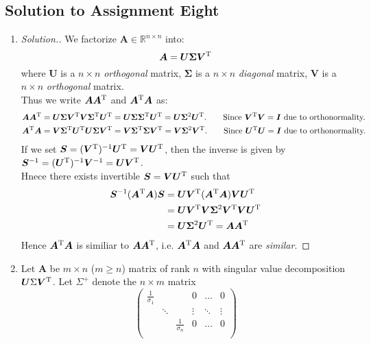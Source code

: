 \subsection{Solution to Assignment Eight}
\begin{enumerate}
\item
\begin{proof}[Solution.] We factorize $\bm A\in\mathbb{R}^{n\times n}$ into:
\[
\bm A=\bm U\bm\Sigma\bm V^{\mathrm T}
\]
where $\bm U$ is a $n\times n$ \emph{orthogonal} matrix,
$\bm\Sigma$ is a $n\times n$ \textit{diagonal} matrix,
$\bm V$ is a $n\times n$ \emph{orthogonal} matrix.\\
Thus we write $\bm A\bm A^{\mathrm T}$ and $\bm A^{\mathrm T}\bm A$ as:
\begin{align*}
\bm A\bm A^{\mathrm T}&=\bm U\bm\Sigma\bm V^{\mathrm T}\bm V\bm \Sigma^{\mathrm T}\bm U^{\mathrm T}=\bm U\bm\Sigma\bm \Sigma^{\mathrm T}\bm U^{\mathrm T}=\bm U\bm\Sigma^2\bm U^{\mathrm T}.\qquad\text{Since $\bm V^{\mathrm T}\bm V=\bm I$ due to orthonormality.}\\
\bm A^{\mathrm T}\bm A&=\bm V\bm \Sigma^{\mathrm T}\bm U^{\mathrm T}\bm U\bm\Sigma\bm V^{\mathrm T}=\bm V\bm \Sigma^{\mathrm T}\bm\Sigma\bm V^{\mathrm T}=\bm V\bm\Sigma^2\bm V^{\mathrm T}.\qquad\text{Since $\bm U^{\mathrm T}\bm U=\bm I$ due to orthonormality.}
\end{align*}
If we set $\bm S=(\bm V^{\mathrm T})^{-1}\bm U^{\mathrm T}=\bm V\bm U^{\mathrm T}$, then the inverse is given by $\bm S^{-1}=(\bm U^{\mathrm T})^{-1}\bm V^{-1}=\bm U\bm V^{\mathrm T}$.\\
Hnece there exists invertible $\bm S=\bm V\bm U^{\mathrm T}$ such that
\[
\begin{aligned}
\bm S^{-1}(\bm A^{\mathrm T}\bm A)\bm S
&=\bm U\bm V^{\mathrm T}(\bm A^{\mathrm T}\bm A)\bm V\bm U^{\mathrm T}\\
&=\bm U\bm V^{\mathrm T}\bm V\bm\Sigma^2\bm V^{\mathrm T}\bm V\bm U^{\mathrm T}\\
&=\bm U\bm\Sigma^2\bm U^{\mathrm T}=\bm A\bm A^{\mathrm T}
\end{aligned}
\]
Hence $\bm A^{\mathrm T}\bm A$ is similiar to $\bm A\bm A^{\mathrm T}$, i.e. $\bm A^{\mathrm T}\bm A$ and $\bm A\bm A^{\mathrm T}$ are \emph{similar}.
\end{proof}
\item
Let $\bm A$ be $m\times n$ ($m\ge n$) matrix of rank $n$ with singular value decomposition $\bm U\Sigma\bm V^{\mathrm T}$. Let $\Sigma^+$ denote the $n\times m$ matrix
\[
\begin{pmatrix}
\frac{1}{\sigma_1}&&&0&\dots&0\\
&\ddots&&\vdots&\ddots&\vdots\\
&&\frac{1}{\sigma_n}&0&\dots&0\\

\end{pmatrix}\]
\end{enumerate}
